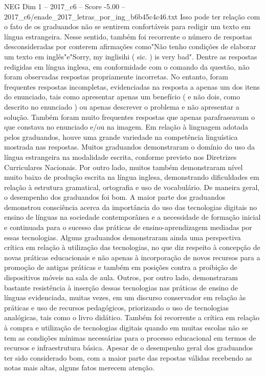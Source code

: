 \begin{textsample}{NEG Dim 1 – 2017\_c6 – Score -5.00 – 2017\_c6/enade\_2017\_letras\_por\_ing\_b6b45c4c46.txt}
Isso pode ter relação com o fato de os graduandos não se sentirem confortáveis para redigir um texto em língua estrangeira.
Nesse sentido, também foi recorrente o número de respostas desconsideradas por conterem afirmações como"Não tenho condições de elaborar um texto em inglês"e"Sorry, my inglisihi ( sic. ) is very bad".
Dentre as respostas redigidas em língua inglesa, em conformidade com o comando da questão, não foram observadas respostas propriamente incorretas.
No entanto, foram frequentes respostas incompletas, evidenciadas na resposta a apenas um dos itens do enunciado, tais como apresentar apenas um benefício ( e não dois, como descrito no enunciado ) ou apenas descrever o problema e não apresentar a solução.
Também foram muito frequentes respostas que apenas parafraseavam o que constava no enunciado e/ou na imagem.
Em relação à linguagem adotada pelos graduandos, houve uma grande variedade na competência linguística mostrada nas respostas.
Muitos graduandos demonstraram o domínio do uso da língua estrangeira na modalidade escrita, conforme previsto nos Diretrizes Curriculares Nacionais.
Por outro lado, muitos também demonstraram nível muito baixo de produção escrita na língua inglesa, demonstrando dificuldades em relação à estrutura gramatical, ortografia e uso de vocabulário.
De maneira geral, o desempenho dos graduandos foi bom.
A maior parte dos graduandos demonstrou consciência acerca da importância do uso das tecnologias digitais no ensino de línguas na sociedade contemporânea e a necessidade de formação inicial e continuada para o sucesso das práticas de ensino-aprendizagem mediadas por essas tecnologias.
Alguns graduandos demonstraram ainda uma perspectiva crítica em relação à utilização das tecnologias, no que diz respeito à concepção de novas práticas educacionais e não apenas à incorporação de novos recursos para a promoção de antigas práticas e também em posições contra a proibição de dispositivos móveis na sala de aula.
Outros, por outro lado, demonstraram bastante resistência à inserção dessas tecnologias nas práticas de ensino de línguas evidenciada, muitas vezes, em um discurso conservador em relação às práticas e uso de recursos pedagógicos, priorizando o uso de tecnologias analógicas, tais como o livro didático.
Também foi recorrente a crítica em relação à compra e utilização de tecnologias digitais quando em muitas escolas não se tem as condições mínimas necessárias para o processo educacional em termos de recursos e infraestrutura básica.
Apesar de o desempenho geral dos graduandos ter sido considerado bom, com a maior parte das repostas válidas recebendo as notas mais altas, alguns fatos merecem atenção.

\end{textsample}
